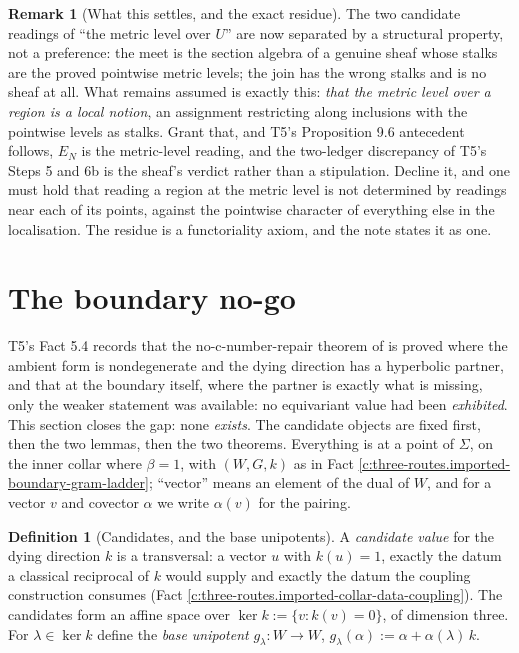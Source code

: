 \documentclass[11pt]{article}
\theoremstyle{definition}
\newtheorem{definition}[theorem]{Definition}
\newtheorem{remark}[theorem]{Remark}
\theoremstyle{plain}
\providecommand{\EN}{}\renewcommand{\EN}{E_{N}}
\providecommand{\Sig}{}\renewcommand{\Sig}{\Sigma}
\begin{document}
\begin{remark}[What this settles, and the exact residue]\label{c:note.three-routes.what-settles-exact-residue}
The two candidate readings of ``the metric level over $U$'' are now separated by a structural property, not a preference: the meet is the section algebra of a genuine sheaf whose stalks are the proved pointwise metric levels; the join has the wrong stalks and is no sheaf at all. What remains assumed is exactly this: \emph{that the metric level over a region is a local notion}, an assignment restricting along inclusions with the pointwise levels as stalks. Grant that, and T5's Proposition 9.6 antecedent follows, $\EN$ is the metric-level reading, and the two-ledger discrepancy of T5's Steps 5 and 6b is the sheaf's verdict rather than a stipulation. Decline it, and one must hold that reading a region at the metric level is not determined by readings near each of its points, against the pointwise character of everything else in the localisation. The residue is a functoriality axiom, and the note states it as one.
\end{remark}

\section{The boundary no-go}

\label{c:note.three-routes.setting-boundary-no-go}
T5's Fact 5.4 records that the no-c-number-repair theorem of \cite[Thm.~4.2]{ButlerT1} is proved where the ambient form is nondegenerate and the dying direction has a hyperbolic partner, and that at the boundary itself, where the partner is exactly what is missing, only the weaker statement was available: no equivariant value had been \emph{exhibited}. This section closes the gap: none \emph{exists}. The candidate objects are fixed first, then the two lemmas, then the two theorems. Everything is at a point of $\Sig$, on the inner collar where $\beta = 1$, with $(W, G, k)$ as in Fact \ref{c:three-routes.imported-boundary-gram-ladder}; ``vector'' means an element of the dual of $W$, and for a vector $v$ and covector $\alpha$ we write $\alpha(v)$ for the pairing.

\begin{definition}[Candidates, and the base unipotents]\label{c:obj.three-routes.candidates-base-unipotents}
A \emph{candidate value} for the dying direction $k$ is a transversal: a vector $u$ with $k(u) = 1$, exactly the datum a classical reciprocal of $k$ would supply and exactly the datum the coupling construction consumes (Fact \ref{c:three-routes.imported-collar-data-coupling}). The candidates form an affine space over $\ker k := \{v : k(v) = 0\}$, of dimension three. For $\lambda \in \ker k$ define the \emph{base unipotent} $g_\lambda : W \to W$, $g_\lambda(\alpha) := \alpha + \alpha(\lambda)\,k$.
\end{definition}
\end{document}
